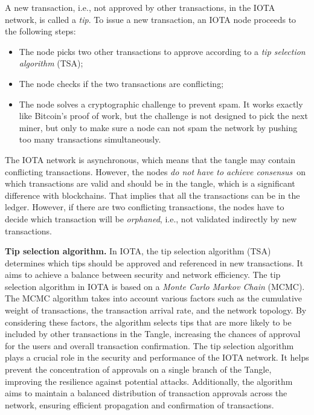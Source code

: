 A new transaction, i.e., not approved by other transactions, in the IOTA network, is called a \emph{tip}. To issue a new transaction, an IOTA node proceeds to the following steps:

\begin{itemize}
  \item The node picks two other transactions to approve according to a \emph{tip selection algorithm} (TSA);
  \item The node checks if the two transactions are conflicting;
  \item The node solves a cryptographic challenge to prevent spam. It works exactly like Bitcoin's proof of work, 
  but the challenge is not designed to pick the next miner, but only to make sure a node can not spam the network 
  by pushing too many transactions simultaneously.
\end{itemize}

The IOTA network is asynchronous, which means that the tangle may contain conflicting transactions. However, the nodes \emph{do not 
have to achieve consensus} on which transactions are valid and should be in the tangle, which is a significant difference with blockchains. 
That implies that all the transactions can be in the ledger. However, if there are two conflicting transactions, the nodes 
have to decide which transaction will be \emph{orphaned}, i.e., not validated indirectly by new transactions.

\textbf{Tip selection algorithm.}
In IOTA, the tip selection algorithm (TSA) determines which tips should be approved and referenced in new transactions.
 It aims to achieve a balance between security and network efficiency.
The tip selection algorithm in IOTA is based on a \emph{Monte Carlo Markov Chain} (MCMC).
The MCMC algorithm takes into account various factors such as the cumulative weight of transactions, 
the transaction arrival rate, and the network topology. By considering these factors,
 the algorithm selects tips that are more likely to be included by other transactions in the Tangle, 
 increasing the chances of approval for the users and overall transaction confirmation.
The tip selection algorithm plays a crucial role in the security and performance of the IOTA network. It helps prevent the concentration of approvals on a single branch of the Tangle,
 improving the resilience against potential attacks. 
Additionally, the algorithm aims to maintain a balanced distribution of transaction approvals across the network,
 ensuring efficient propagation and confirmation of transactions.

